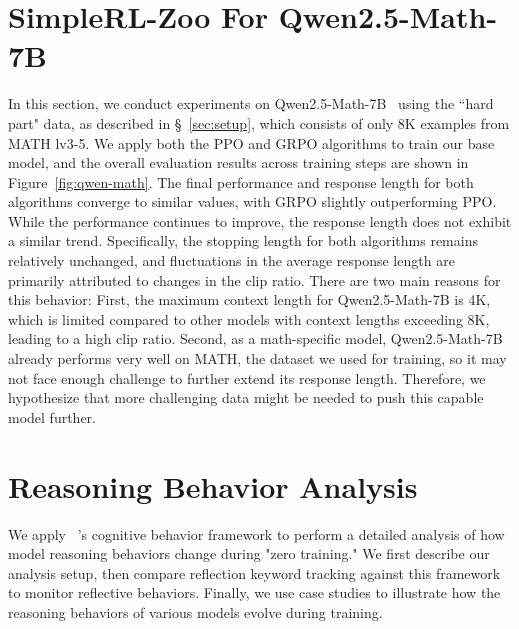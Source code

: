 \section{SimpleRL-Zoo For Qwen2.5-Math-7B}
In this section, we conduct experiments on Qwen2.5-Math-7B~\citep{yang2024qwen2} using the ``hard part" data, as described in \S~\ref{sec:setup}, which consists of only 8K examples from MATH lv3-5. We apply both the PPO and GRPO algorithms to train our base model, and the overall evaluation results across training steps are shown in Figure~\ref{fig:qwen-math}. The final performance and response length for both algorithms converge to similar values, with GRPO slightly outperforming PPO. While the performance continues to improve, the response length does not exhibit a similar trend. Specifically, the stopping length for both algorithms remains relatively unchanged, and fluctuations in the average response length are primarily attributed to changes in the clip ratio. There are two main reasons for this behavior: First, the maximum context length for Qwen2.5-Math-7B is 4K, which is limited compared to other models with context lengths exceeding 8K, leading to a high clip ratio. Second, as a math-specific model, Qwen2.5-Math-7B already performs very well on MATH, the dataset we used for training, so it may not face enough challenge to further extend its response length. Therefore, we hypothesize that more challenging data might be needed to push this capable model further.
\begin{figure*}[]
    \centering
     \vspace{-10pt}
    \caption{Comparison of accuracy and response length between PPO and GRPO on Qwen2.5-Math-7B. The base model is trained using 8K examples from MATH lv3-5, with the same settings described in \S~\ref{sec:setup}.}
    \label{fig:qwen-math}
\end{figure*}


\section{Reasoning Behavior Analysis}
\label{appx:bahaviour}
We apply ~\citet{gandhi2025cognitive}'s cognitive behavior framework to perform a detailed analysis of how model reasoning behaviors change during "zero training." We first describe our analysis setup, then compare reflection keyword tracking against this framework to monitor reflective behaviors. Finally, we use case studies to illustrate how the reasoning behaviors of various models evolve during training.

